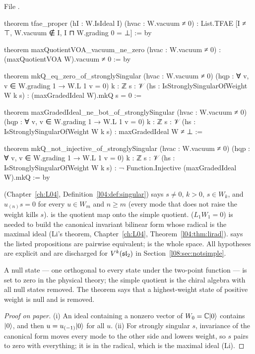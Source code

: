 \noindent File .
\begin{leancode}
theorem tfae_proper (hI : W.IsIdeal I) (hvac : W.vacuum ≠ 0) :
    List.TFAE [I ≠ ⊤, W.vacuum ∉ I, I ⊓ W.grading 0 = ⊥] := by

theorem maxQuotientVOA_vacuum_ne_zero (hvac : W.vacuum ≠ 0) :
    (maxQuotientVOA W).vacuum ≠ 0 := by

theorem mkQ_eq_zero_of_stronglySingular (hvac : W.vacuum ≠ 0)
    (hqp : ∀ v, v ∈ W.grading 1 → W.L 1 v = 0) {k : ℤ} {s : 𝒱}
    (hs : IsStronglySingularOfWeight W k s) : (maxGradedIdeal W).mkQ s = 0 :=

theorem maxGradedIdeal_ne_bot_of_stronglySingular (hvac : W.vacuum ≠ 0)
    (hqp : ∀ v, v ∈ W.grading 1 → W.L 1 v = 0) {k : ℤ} {s : 𝒱}
    (hs : IsStronglySingularOfWeight W k s) : maxGradedIdeal W ≠ ⊥ :=

theorem mkQ_not_injective_of_stronglySingular (hvac : W.vacuum ≠ 0)
    (hqp : ∀ v, v ∈ W.grading 1 → W.L 1 v = 0) {k : ℤ} {s : 𝒱}
    (hs : IsStronglySingularOfWeight W k s) :
    ¬ Function.Injective (maxGradedIdeal W).mkQ := by
\end{leancode}

\begin{dictionary}
 (Chapter~\ref{ch:L04}, Definition~\ref{l04:def:singular}) says
$s\ne0$, $k>0$, $s\in W_k$, and $u_{(n)}s = 0$ for every $u\in W_m$ and $n\ge m$ (every mode that does
not raise the weight kills $s$).  is the quotient map onto the simple
quotient.  ($L_1W_1 = 0$) is needed to build the canonical invariant bilinear form whose
radical is the maximal ideal (Li's theorem, Chapter~\ref{ch:L04}, Theorem~\ref{l04:thm:lirad}).  says the listed propositions are pairwise equivalent;  is the whole space. All hypotheses are explicit and are discharged for
$V^k(\mathfrak{sl}_2)$ in Section~\ref{l08:sec:notsimple}.
\end{dictionary}

\begin{physics}
A null state --- one orthogonal to every state under the two-point function --- is set to zero in the
physical theory; the simple quotient is the chiral algebra with all null states removed. The theorem
says that a highest-weight state of positive weight is null and is removed.
\end{physics}

\begin{proof}[Proof on paper]
(i) An ideal containing a nonzero vector of $W_0 = {\mathbb{C}}|0\rangle$ contains $|0\rangle$, and then
$u = u_{(-1)}|0\rangle$ for all $u$. (ii) For strongly singular $s$, invariance of the canonical form
moves every mode to the other side and lowers weight, so $s$ pairs to zero with everything; it is in the
radical, which is the maximal ideal (Li).
\end{proof}


